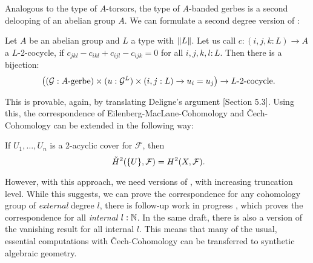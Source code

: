 Analogous to the type of $A$-torsors, the type of $A$-banded gerbes is a second delooping of an abelian group $A$.
We can formulate a second degree version of :

\begin{theorem}
  \label{deligne-construction-gerbes}
  Let $A$ be an abelian group and $L$ a type with $\lVert L \rVert$.
  Let us call $c:(i,j,k : L)\to A$ a $L$-2-cocycle,
  if $c_{jkl}-c_{ikl}+c_{ijl}-c_{ijk}=0$ for all $i,j,k,l : L$.
  Then there is a bijection:
  \[
    \left((\mathcal G:\text{$A$-gerbe})\times (u:\mathcal G^{L})\times (i,j : L) \to u_i=u_j\right) \to \text{$L$-2-cocycle}
    \rlap{.}
  \]
\end{theorem}

This is provable, again, by translating Deligne's argument \cite{Deligne91}[Section 5.3].
Using this, the correspondence of Eilenberg-MacLane-Cohomology and \v{C}ech-Cohomology can be extended in the following way:

\begin{theorem}
  If $U_1,\dots,U_n$ is a 2-acyclic cover for $\mathcal F$, then
  \[
    \check{H}^2(\{U\},\mathcal F)=H^2(X,\mathcal F)\rlap{.}
  \]  
\end{theorem}

However, with this approach, we need versions of , with increasing truncation level.
While this suggests, we can prove the correspondence for any cohomology group of \emph{external} degree $l$,
there is follow-up work in progress \cite{cech-draft},
which proves the correspondence for all \emph{internal} $l:\mathbb{N}$.
In the same draft, there is also a version of the vanishing result for all internal $l$.
This means that many of the usual, essential computations with \v{C}ech-Cohomology can be transferred to synthetic algebraic geometry.

